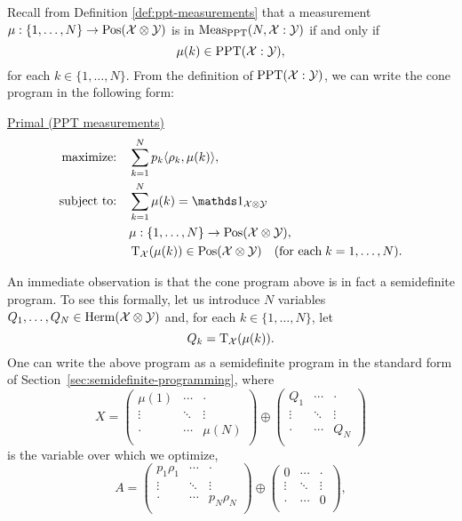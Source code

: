 Recall from Definition \ref{def:ppt-measurements} that a measurement 
$\mu : \{1, \ldots, N\} \rightarrow \mathrm{Pos}(\mathcal{X}\otimes\mathcal{Y})$ is in 
$\mathrm{Meas}_{\mathrm{PPT}}(N, \mathcal{X}:\mathcal{Y})$ if and only if
\begin{equation}
  \mu(k) \in \mathrm{PPT}(\mathcal{X}:\mathcal{Y}),
\end{equation}
for each $k \in \{1,\ldots,N\}$. From the definition of $\mathrm{PPT}(\mathcal{X}:\mathcal{Y})$, 
we can write the cone program in the following form:
\begin{center}
\underline{Primal (PPT measurements)}
\begin{equation}
  \label{eq:ppt-primal-problem}
  \begin{split}
    \text{maximize:} \quad & 
      \sum_{k=1}^{N} p_{k}\ip{\rho_{k}}{\mu(k)},\\
    \text{subject to:} \quad & \sum_{k=1}^{N} \mu(k) = \I_{\X\otimes\Y}\\
    & \mu : \{1,\ldots, N\}\rightarrow \Pos(\X\otimes\Y),\\
    & \pt_{\X}(\mu(k))\in\Pos(\X\otimes\Y) \quad(\text{for each}\;k = 1,\ldots,N).
  \end{split}
\end{equation}
\end{center}
An immediate observation is that the cone program above is in fact a semidefinite 
program. To see this formally, let us introduce $N$ variables 
$Q_{1},\ldots,Q_{N} \in \mathrm{Herm}(\mathcal{X}\otimes\mathcal{Y})$ and, for each $k \in \{1, \ldots, N\}$, let
\begin{equation}
  Q_{k} = \operatorname{T}_{\mathcal{X}}(\mu(k)).
\end{equation}
One can write the above program as a semidefinite program in the standard form of 
Section~\ref{sec:semidefinite-programming}, where
\begin{equation}
\label{eq:ppt-X}
X = \begin{pmatrix}
      \mu(1) & \cdots & \cdot\\
      \vdots & \ddots & \vdots\\
      \cdot & \cdots & \mu(N)\\
  \end{pmatrix}
  \oplus
  \begin{pmatrix}
      Q_1 & \cdots & \cdot\\
      \vdots & \ddots & \vdots\\
      \cdot & \cdots & Q_N\\
  \end{pmatrix}
\end{equation}
is the variable over which we optimize,
\begin{equation}
  A = \begin{pmatrix}
      p_{1}\rho_{1} & \cdots & \cdot\\
      \vdots & \ddots & \vdots\\
      \cdot & \cdots & p_{N}\rho_{N}\\
  \end{pmatrix}
  \oplus
  \begin{pmatrix}
      0 & \cdots & \cdot\\
      \vdots & \ddots & \vdots\\
      \cdot & \cdots & 0\\
  \end{pmatrix},
\end{equation}

